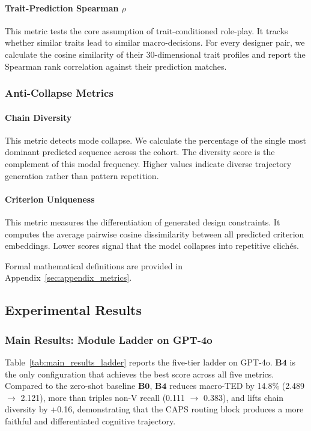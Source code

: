 \documentclass[11pt]{article}
\begin{document}
\paragraph{Trait-Prediction Spearman $\rho$}
This metric tests the core assumption of trait-conditioned role-play. It tracks whether similar traits lead to similar macro-decisions. For every designer pair, we calculate the cosine similarity of their 30-dimensional trait profiles and report the Spearman rank correlation against their prediction matches.

\subsubsection{Anti-Collapse Metrics}

\paragraph{Chain Diversity}
This metric detects mode collapse. We calculate the percentage of the single most dominant predicted sequence across the cohort. The diversity score is the complement of this modal frequency. Higher values indicate diverse trajectory generation rather than pattern repetition.

\paragraph{Criterion Uniqueness}
This metric measures the differentiation of generated design constraints. It computes the average pairwise cosine dissimilarity between all predicted criterion embeddings. Lower scores signal that the model collapses into repetitive clichés.

Formal mathematical definitions are provided in Appendix~\ref{sec:appendix_metrics}.

\subsection{Experimental Results}

\subsubsection{Main Results: Module Ladder on GPT-4o}

Table~\ref{tab:main_results_ladder} reports the five-tier ladder on GPT-4o. $\textbf{B4}$ is the only configuration that achieves the best score across all five metrics. Compared to the zero-shot baseline $\textbf{B0}$, $\textbf{B4}$ reduces macro-TED by 14.8\% (2.489 $\rightarrow$ 2.121), more than triples non-V recall (0.111 $\rightarrow$ 0.383), and lifts chain diversity by +0.16, demonstrating that the CAPS routing block produces a more faithful and differentiated cognitive trajectory. 
\end{document}
